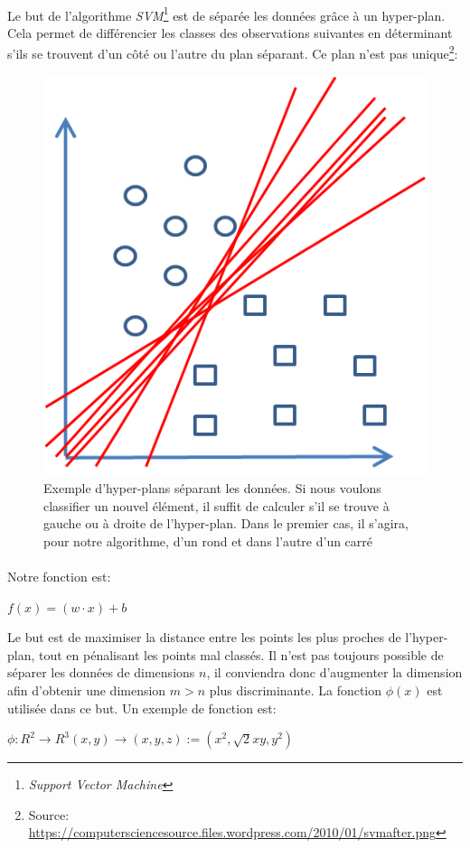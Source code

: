\documentclass[a4paper, 11pt]{article}
\begin{document}
\paragraph{}
Le but de l'algorithme \textit{SVM}\footnote{\textit{Support Vector Machine}} est de séparée les données grâce à un hyper-plan. Cela permet de différencier les classes des observations suivantes en déterminant s'ils se trouvent d'un côté ou l'autre du plan séparant. Ce plan n'est pas unique\footnote{Source: \url{https://computersciencesource.files.wordpress.com/2010/01/svmafter.png}}: 
\begin{figure}[h!]
\centering
\includegraphics{images/svm_exemple}
\caption{Exemple d'hyper-plans séparant les données. Si nous voulons classifier un nouvel élément, il suffit de calculer s'il se trouve à gauche ou à droite de l'hyper-plan. Dans le premier cas, il s'agira, pour notre algorithme, d'un rond et dans l'autre d'un carré}
\end{figure}

\paragraph{}
Notre fonction est:
\begin{center}
$f(x) = (w \cdot x) + b$
\end{center}
Le but est de maximiser la distance entre les points les plus proches de l'hyper-plan, tout en pénalisant les points mal classés. Il n'est pas toujours possible de séparer les données de dimensions $n$, il conviendra donc d'augmenter la dimension afin d'obtenir une dimension $m > n$ plus discriminante. La fonction $\phi(x)$ est utilisée dans ce but. Un exemple de fonction est:
\begin{center}
$\phi: R^2 \rightarrow R^3 (x, y) \rightarrow (x, y, z):= (x^2, \sqrt{2}x y, y^2)$
\end{center}
\end{document}

